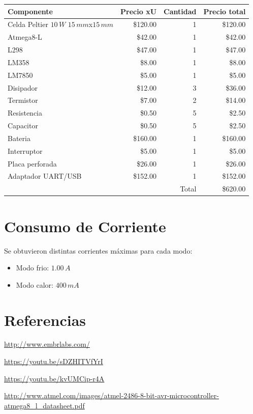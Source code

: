 \documentclass[10pt,spanish,a4paper,openany,notitlepage]{article}
\begin{document}
\begin{center}
\begin{tabular}{|l|r|r|r|}\hline
Componente&Precio xU&Cantidad&Precio total\\ \hline
Celda Peltier $10\, \unit{W}$ $15\, \unit{mm}$x$15\, \unit{mm}$ &\$120.00&1&\$120.00\\ \hline
Atmega8-L &\$42.00&1&\$42.00\\ \hline
L298 &\$47.00&1&\$47.00\\ \hline
LM358 &\$8.00&1&\$8.00\\ \hline
LM7850 &\$5.00&1&\$5.00\\ \hline
Disipador &\$12.00&3&\$36.00\\ \hline
Termistor &\$7.00&2&\$14.00\\ \hline
Resistencia &\$0.50&5&\$2.50\\ \hline
Capacitor &\$0.50&5&\$2.50\\ \hline 
Bateria &\$160.00&1&\$160.00\\ \hline
Interruptor &\$5.00&1&\$5.00\\ \hline
Placa perforada &\$26.00&1&\$26.00\\ \hline
Adaptador UART/USB & \$152.00 & 1 & \$152.00 \\ \hline 
\multicolumn{3}{|r|}{Total}&\$620.00\\ \hline
\end{tabular}
\end{center}

\section{Consumo de Corriente}

Se obtuvieron distintas corrientes máximas para cada modo:

\begin{itemize}
\item{Modo frio:} $1.00\, \unit{A}$
\item{Modo calor:} $400\, \unit{mA}$
\end{itemize} 

\section{Referencias}



\begingroup	%
\renewcommand{\section}[2]{}%
\begin{thebibliography}{}
  \url{http://www.embrlabs.com/}

  \url{https://youtu.be/sDZHITVfYrI}
  
  \url{https://youtu.be/kvUMCip-r4A}

  \url{http://www.atmel.com/images/atmel-2486-8-bit-avr-microcontroller-atmega8_l_datasheet.pdf}
\end{thebibliography}
\endgroup
\end{document}

